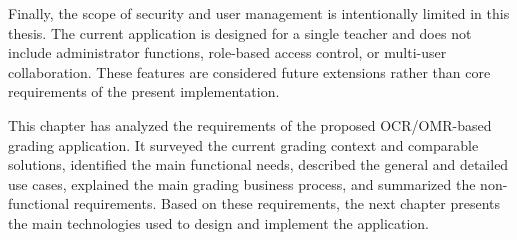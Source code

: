 \documentclass[../Main.tex]{subfiles}
\begin{document}
Finally, the scope of security and user management is intentionally limited in
this thesis. The current application is designed for a single teacher and does not
include administrator functions, role-based access control, or multi-user
collaboration. These features are considered future extensions rather than core
requirements of the present implementation.

This chapter has analyzed the requirements of the proposed OCR/OMR-based grading
application. It surveyed the current grading context and comparable solutions,
identified the main functional needs, described the general and detailed use
cases, explained the main grading business process, and summarized the
non-functional requirements. Based on these requirements, the next chapter
presents the main technologies used to design and implement the application.
\end{document}
